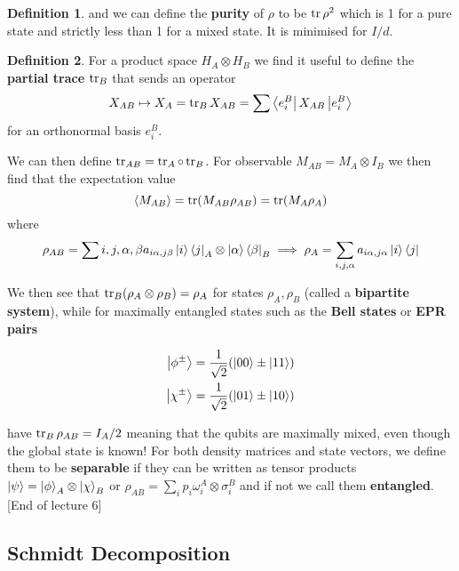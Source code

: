 \documentclass{article}
\theoremstyle{definition}
\newtheorem{definition}{Definition}
\begin{document}
\begin{definition}
and we can define the \textbf{purity} of $\rho$ to be $\tr \rho^2$ which is 1
for a pure state and strictly less than 1 for a mixed state. It is minimised for
$I / d$.
\end{definition}

\begin{definition}
  For a product space $H_A \otimes H_B$ we find it useful to define the
  \textbf{partial trace} $\tr_B$ that sends an operator
  \begin{equation}
    X_{AB} \mapsto X_A = \tr_B X_{AB} = \sum \bra{e_i^B} X_{AB} \ket{e_i^B}
  \end{equation}
  for an orthonormal basis $e_i^B$.
\end{definition}

We can then define $\tr_{AB} = \tr_A \circ \tr_B$. For observable $M_{AB} = M_A
\otimes I_B$ we then find that the expectation value
\begin{equation}
\langle M_{AB} \rangle = \tr(M_{AB} \rho_{AB}) = \tr(M_A \rho_A)
\end{equation}
where
\begin{equation}
\rho_{AB} = \sum{i,j,\alpha,\beta} a_{i\alpha, j\beta} \ket{i}\bra{j}_A \otimes
\ket{\alpha}\bra{\beta}_B 
\implies \rho_A = \sum_{i, j, \alpha} a_{i\alpha, j\alpha} \ket{i}\bra{j}
\end{equation}

We then see that $\tr_B(\rho_A \otimes \rho_B) = \rho_A$ for states $\rho_A,
\rho_B$ (called a \textbf{bipartite system}), while for maximally entangled
states such as the \textbf{Bell states} or \textbf{EPR pairs}

\begin{align}
\ket{\phi^\pm} = \frac{1}{\sqrt{2}} (\ket{00} \pm \ket{11}) \\
\ket{\chi^\pm} = \frac{1}{\sqrt{2}} (\ket{01} \pm \ket{10})
\end{align}

have $\tr_B \rho_{AB} = I_A / 2$ meaning that the qubits are maximally mixed,
even though the global state is known! For both density matrices and state
vectors, we define them to be \textbf{separable} if they can be written as
tensor products $\ket{\psi} = \ket{\phi}_A \otimes \ket{\chi}_B$ or $\rho_{AB} =
\sum_i p_i \omega_i^A \otimes \sigma_i^B$ and if not we call them
\textbf{entangled}. [End of lecture 6]

\subsection{Schmidt Decomposition}
\end{document}
